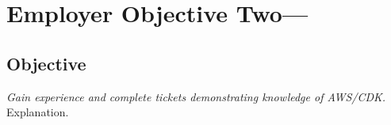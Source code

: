 \section{Employer Objective Two---}
\subsection{Objective}
\emph{Gain experience and complete tickets demonstrating knowledge of AWS/CDK.} Explanation.
